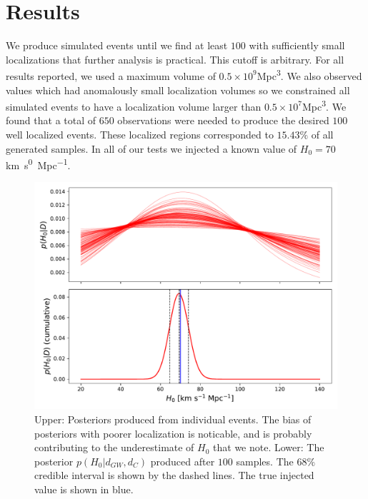 \section{Results} \label{sec:conclusions}
We produce simulated events until we find at least $100$ with sufficiently small localizations that further analysis is practical.
This cutoff is arbitrary. For all results reported, we used a maximum volume of $0.5\times 10^{9}$\si{Mpc^3}.
We also observed values which had anomalously small localization volumes so we constrained all simulated events to have a localization volume larger than $0.5\times 10^{7}$\si{Mpc^3}.
We found that a total of $650$ observations were needed to produce the desired $100$ well localized events.
These localized regions corresponded to $15.43\%$ of all generated samples.
In all of our tests we injected a known value of $H_0=70$ \si{km.s^{0}.Mpc^{-1}}.


\begin{figure}[t]
    \centering
    \includegraphics[width=\columnwidth]{figures/posterior.pdf}
    \caption{Upper: Posteriors produced from individual events. The bias of posteriors with poorer localization is noticable, and is probably contributing to the underestimate of $H_0$ that we note. Lower: The posterior $p(H_0 | d_{GW}, d_C)$ produced after $100$ samples. The $68\%$ credible interval is shown by the dashed lines. The true injected value is shown in blue.}
    \label{fig:posterior}
\end{figure}

